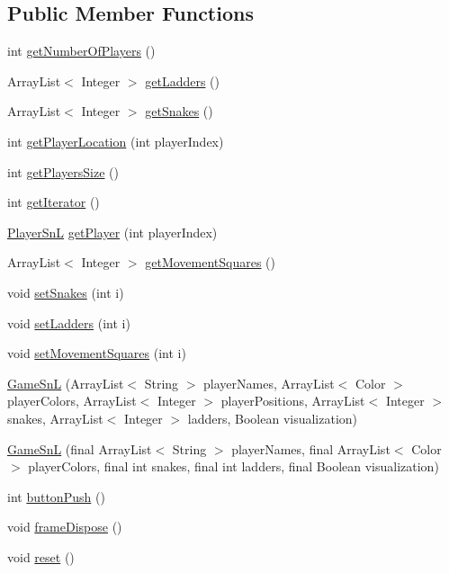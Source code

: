 \subsection*{Public Member Functions}
\begin{DoxyCompactItemize}
\item 
int \hyperlink{class_game_1_1_game_sn_l_a7dc9a794ee67fda75110c95f37927bfd}{get\+Number\+Of\+Players} ()
\item 
Array\+List$<$ Integer $>$ \hyperlink{class_game_1_1_game_sn_l_a6b0635ee59d9a41d6d99d46c2695ac1d}{get\+Ladders} ()
\item 
Array\+List$<$ Integer $>$ \hyperlink{class_game_1_1_game_sn_l_a22041d671d2441ef54db03691e0005f8}{get\+Snakes} ()
\item 
int \hyperlink{class_game_1_1_game_sn_l_a3be79ab2fef3a95a5225df2c070ded0f}{get\+Player\+Location} (int player\+Index)
\item 
int \hyperlink{class_game_1_1_game_sn_l_aeee36f69ce6b0181699985b4f8f33804}{get\+Players\+Size} ()
\item 
int \hyperlink{class_game_1_1_game_sn_l_a17f7962bedb5c8342429d9193fda4109}{get\+Iterator} ()
\item 
\hyperlink{class_player_1_1_player_sn_l}{Player\+Sn\+L} \hyperlink{class_game_1_1_game_sn_l_a076667f8879f4028f32f7b6e9a12a56e}{get\+Player} (int player\+Index)
\item 
Array\+List$<$ Integer $>$ \hyperlink{class_game_1_1_game_sn_l_a3039b9412740fd591db9adf56d1e27e2}{get\+Movement\+Squares} ()
\item 
void \hyperlink{class_game_1_1_game_sn_l_af55a1bc816074728dd65958c30929374}{set\+Snakes} (int i)
\item 
void \hyperlink{class_game_1_1_game_sn_l_a08b5522b146d49dcef3c4b3a477314ee}{set\+Ladders} (int i)
\item 
void \hyperlink{class_game_1_1_game_sn_l_a4b111f57d294bb007201657c20cf6938}{set\+Movement\+Squares} (int i)
\item 
\hyperlink{class_game_1_1_game_sn_l_a76663e6331e7f09bdb0baaf6d3f28b2f}{Game\+Sn\+L} (Array\+List$<$ String $>$ player\+Names, Array\+List$<$ Color $>$ player\+Colors, Array\+List$<$ Integer $>$ player\+Positions, Array\+List$<$ Integer $>$ snakes, Array\+List$<$ Integer $>$ ladders, Boolean visualization)
\item 
\hyperlink{class_game_1_1_game_sn_l_a6fe06bf600d5c45331213809355c2dea}{Game\+Sn\+L} (final Array\+List$<$ String $>$ player\+Names, final Array\+List$<$ Color $>$ player\+Colors, final int snakes, final int ladders, final Boolean visualization)
\item 
int \hyperlink{class_game_1_1_game_sn_l_ae00564fcdb6a04cf947fbd9a3a540afc}{button\+Push} ()
\item 
void \hyperlink{class_game_1_1_game_sn_l_aef0c39ae2a4b0a54a2fa7f7a9037ac23}{frame\+Dispose} ()
\item 
void \hyperlink{class_game_1_1_game_sn_l_a144de1dde78fd74ce80cc83793414171}{reset} ()
\end{DoxyCompactItemize}
